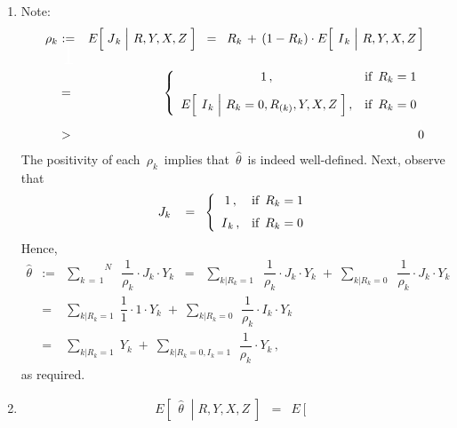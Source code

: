 \begin{enumerate}
\item
	Note:
	\begin{eqnarray*}
	\rho_{k}
	& \underset{{\color{white}\textnormal{\Huge 1}}}{:=} &
		E\!\left[\,\left.\overset{{\color{white}.}}{J}_{k}\;\right\vert\,R,Y,X,Z\;\right]
	\;\; = \;\;
		R_{k} \,+\, (1-R_{k}) \cdot E\!\left[\;\left.\overset{{\color{white}.}}{I}_{k}\;\right\vert\,R,Y,X,Z\,\right]
	\\
	& = &
		\left\{\begin{array}{cl}
		1\,, & \textnormal{if \,$R_{k} = 1$}
		\\
		\overset{{\color{white}1}}{E\!\left[\;\left.\overset{{\color{white}.}}{I}_{k}\;\right\vert\,R_{k}=0,R_{(k)},Y,X,Z\;\right]}\,,
		& \textnormal{if \,$R_{k} = 0$}
		\end{array}\right.
	\\
	& > &
		\overset{{\color{white}\huge 1}}{0}
	\end{eqnarray*}
	The positivity of each \,$\rho_{k}$\, implies that \,$\widehat{\theta}$\, is indeed well-defined.
	Next, observe that
	\begin{equation*}
	J_{k}
	\;\;\ = \;\;
		\left\{\begin{array}{cl}
		1\,, & \textnormal{if \,$R_{k} = 1$}
		\\
		\overset{{\color{white}1}}{I}_{k}\,, & \textnormal{if \,$R_{k} = 0$}
		\end{array}\right.
	\end{equation*}
	Hence,
	\begin{eqnarray*}
	\widehat{\theta}
	& := &
		\overset{N}{\underset{k\,=\,1}{\sum}}\;\;
		\dfrac{1}{\rho_{k}} \cdot J_{k} \cdot Y_{k}
	\;\; = \;\;
		\underset{k\vert R_{k}=1}{\sum}\;\; \dfrac{1}{\rho_{k}} \cdot J_{k} \cdot Y_{k}
		\; + \;
		\underset{k\vert R_{k}=0}{\sum}\;\; \dfrac{1}{\rho_{k}} \cdot J_{k} \cdot Y_{k}
	\\
	& = &
		\underset{k\vert R_{k}=1}{\sum}\; \dfrac{1}{1} \cdot 1 \cdot Y_{k}
		\; + \;
		\underset{k\vert R_{k}=0}{\sum}\;\, \dfrac{1}{\rho_{k}} \cdot I_{k} \cdot Y_{k}
	\\
	& = &
		\underset{k\vert R_{k}=1}{\sum}\; Y_{k}
		\; + \;
		\underset{k\vert R_{k}=0,I_{k}=1}{\sum}\;\, \dfrac{1}{\rho_{k}} \cdot Y_{k}\,,
	\end{eqnarray*}
	as required.
\item
	\begin{eqnarray*}
	E\!\left[\;\,\left.\widehat{\theta}\;\;\right\vert\;R,Y,X,Z\;\right]
	& = &
		E\!\left[\;\,
			\left.

\end{eqnarray*}
\end{enumerate}
